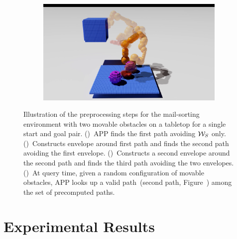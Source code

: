 \documentclass[a4paper]{report}
\begin{document}
\begin{figure}[t]
\begin{subfigure}{0.48\textwidth}
        \caption{}
        \label{fig:pr3}
    \end{subfigure}
    \begin{subfigure}{0.48\textwidth}
         \includegraphics[trim={8cm 0 10cm 1cm},clip, width=\textwidth]{path4.png}
        \caption{}
        \label{fig:prq}
    \end{subfigure}
    \caption{
    Illustration of the preprocessing steps for the mail-sorting environment with two movable obstacles on a tabletop for a single start and goal pair.
     ()~APP finds the first path avoiding $\mathcal{W}_S$ only.
    ()~Constructs envelope around first path and finds the second path avoiding the first envelope.
    ()~Constructs a second envelope around the second path and finds the third path avoiding the two envelopes.
    ()~At query time, given a random configuration of movable obstacles, APP looks up a valid path~(second path, Figure~) among the set of precomputed paths.
    }
    \label{fig:pr}
\end{figure}

\section{Experimental Results}
\end{document}

